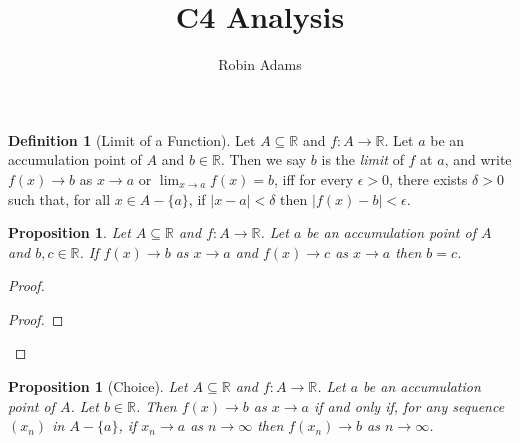 \documentclass{article}
\title{C4 Analysis}
\author{Robin Adams}
\let\qed\relax
\newtheorem{proposition}[axiom]{Proposition}
\theoremstyle{definition}
\newtheorem{definition}[axiom]{Definition}
\begin{document}
\maketitle

\begin{definition}[Limit of a Function]
    Let $A \subseteq \mathbb{R}$ and $f : A \rightarrow \mathbb{R}$. Let $a$ be an accumulation point of $A$ and $b \in \mathbb{R}$.
    Then we say $b$ is the \emph{limit} of $f$ at $a$, and write $f(x) \rightarrow b$ as $x \rightarrow a$ or $\lim_{x \rightarrow a} f(x) = b$, iff for every $\epsilon > 0$,
    there exists $\delta > 0$ such that, for all $x \in A - \{ a \}$, if $|x-a| < \delta$ then $|f(x)-b| < \epsilon$.
\end{definition}

\begin{proposition}
    Let $A \subseteq \mathbb{R}$ and $f : A \rightarrow \mathbb{R}$. Let $a$ be an accumulation point of $A$ and $b, c \in \mathbb{R}$.
    If $f(x) \rightarrow b$ as $x \rightarrow a$ and $f(x) \rightarrow c$ as $x \rightarrow a$ then $b = c$.
\end{proposition}

\begin{proof}
    \pf
    \begin{proof}
    \end{proof}
    \qed
\end{proof}

\begin{proposition}[Choice]
    Let $A \subseteq \mathbb{R}$ and $f : A \rightarrow \mathbb{R}$. Let $a$ be an accumulation point of $A$. Let $b \in \mathbb{R}$.
    Then $f(x) \rightarrow b$ as $x \rightarrow a$ if and only if, for any sequence $(x_n)$ in $A - \{a\}$, if $x_n \rightarrow a$ as $n
    \rightarrow \infty$ then $f(x_n) \rightarrow b$ as $n \rightarrow \infty$.
\end{proposition}
\end{document}
